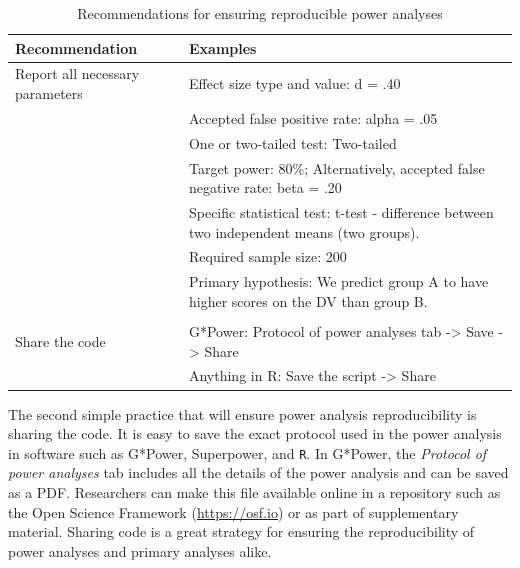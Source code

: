 \documentclass[
  man, donotrepeattitle,mask,floatsintext]{apa7}
\begin{document}
\begin{landscape}
\begin{longtable}[l]{ll}
\caption{\label{tab:table1}Recommendations for ensuring reproducible power analyses}\\
\toprule
Recommendation & Examples\\
\midrule
Report all necessary parameters & Effect size type and value: d = .40\\
\addlinespace
 & Accepted false positive rate: alpha = .05\\
\addlinespace
 & One or two-tailed test: Two-tailed\\
\addlinespace
 & Target power: 80\%; Alternatively, accepted false negative rate: beta = .20\\
\addlinespace
 & Specific statistical test: t-test - difference between two independent means (two groups).\\
\addlinespace
 & Required sample size: 200\\
\addlinespace
 & Primary hypothesis: We predict group A to have higher scores on the DV than group B.\\
\addlinespace
 & \\
\addlinespace
Share the code & G*Power: Protocol of power analyses tab -> Save -> Share\\
\addlinespace
 & Anything in R: Save the script -> Share\\
\bottomrule
\end{longtable}
\end{landscape}
\endgroup{}

The second simple practice that will ensure power analysis reproducibility is sharing the code. It is easy to save the exact protocol used in the power analysis in software such as G*Power, Superpower, and \texttt{R}. In G*Power, the \emph{Protocol of power analyses} tab includes all the details of the power analysis and can be saved as a PDF. Researchers can make this file available online in a repository such as the Open Science Framework (\url{https://osf.io}) or as part of supplementary material. Sharing code is a great strategy for ensuring the reproducibility of power analyses and primary analyses alike.
\end{document}
